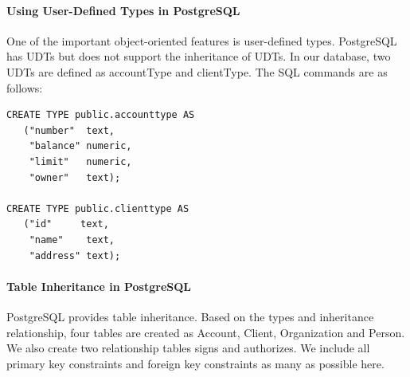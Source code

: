 \documentclass[11pt]{article}
\begin{document}
\paragraph{Using User-Defined Types in PostgreSQL}

\par
One of the important object-oriented features is user-defined types. PostgreSQL has UDTs but does not support the inheritance of UDTs. In our database, two UDTs are defined as accountType and clientType. The SQL commands are as follows:

\begin{verbatim}
CREATE TYPE public.accounttype AS
   ("number"  text,
    "balance" numeric,
    "limit"   numeric,
    "owner"   text);

CREATE TYPE public.clienttype AS
   ("id"     text,
    "name"    text,
    "address" text);
\end{verbatim}

\paragraph{Table Inheritance in PostgreSQL}
\par
PostgreSQL provides table inheritance. Based on the types and inheritance relationship, four tables are created as Account, Client, Organization and Person. We also create two relationship tables signs and authorizes. We include all primary key constraints and foreign key constraints as many as possible here.
\end{document}
